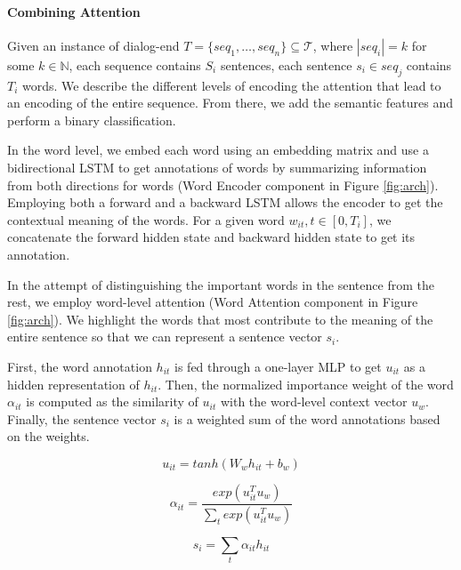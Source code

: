 
\paragraph*{Combining Attention}
Given an instance of dialog-end $T=\{seq_1, \ldots, seq_n\} \subseteq \mathcal{T}$, where $|seq_i| = k$ for some $k \in \mathbb{N}$, each sequence contains $S_i$ sentences, each sentence $s_i \in seq_j$ contains $T_i$ words. 
We describe the different levels of encoding the attention that lead 
to an encoding of the entire sequence. From there, we add the semantic features and perform 
a binary classification. 

In the word level, we embed each word using an embedding matrix \cite{glove} 
and use a bidirectional LSTM 
to get annotations of words by summarizing information
from both directions for words (Word Encoder component in Figure \ref{fig:arch}). 
Employing both a forward and a backward LSTM 
allows the encoder to get the contextual meaning of the words. 
For a given word $w_{it}, t\in [0,T_i]$, 
we concatenate the forward hidden state and
backward hidden state to get its annotation. 

In the attempt of distinguishing the important 
words in the sentence from the rest, we employ word-level 
attention (Word Attention component in Figure \ref{fig:arch}). We highlight the words that most contribute 
to the meaning of the entire sentence so that we can represent 
a sentence vector $s_i$. 

First, the word annotation $h_{it}$ is fed 
through a one-layer MLP to get $u_{it}$ as a hidden representation
of $h_{it}$. Then, the normalized importance weight of the word $\alpha_{it}$ 
is computed as the similarity of $u_{it}$ with the word-level 
context vector $u_w$. 
Finally, the sentence vector $s_i$ is a weighted sum of the word annotations
based on the weights. 

\begin{equation*}
	u_{it} = tanh(W_w h_{it} + b_w)
\end{equation*}

\begin{equation*}
	\alpha_{it} = \frac{exp(u^T_{it} u_w)}{\sum_t exp(u^T_{it} u_w)}
\end{equation*}

\begin{equation*}
	s_i = \sum_{t} \alpha_{it} h_{it}
\end{equation*}

